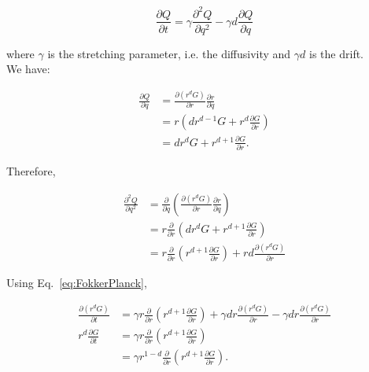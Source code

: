 \begin{equation}
\frac{\partial Q}{\partial t}=\gamma\frac{\partial^{2}Q}{\partial q^{2}}-\gamma d\frac{\partial Q}{\partial q}\label{eq:FokkerPlanck}
\end{equation}

where $\gamma$ is the stretching parameter, i.e. the diffusivity and $\gamma d$ is the drift. \\

We have:

\begin{subequations} 
\begin{align}
\frac{\partial Q}{\partial q} & =\frac{\partial(r^{d}G)}{\partial r}\frac{\partial r}{\partial q}\label{computedGdQ1}\\
 & =r\left(dr^{d-1}G+r^{d}\frac{\partial G}{\partial r}\right)\label{computedGdQ2}\\
 & =dr^{d}G+r^{d+1}\frac{\partial G}{\partial r}.
\end{align}
 \end{subequations}

Therefore,

\begin{subequations}

\begin{align}
\frac{\partial^{2}Q}{\partial q^{2}} & =\frac{\partial}{\partial q}\left(\frac{\partial(r^{d}G)}{\partial r}\frac{\partial r}{\partial q}\right)\label{computedGdQ1-1}\\
 & =r\frac{\partial}{\partial r}\left(dr^{d}G+r^{d+1}\frac{\partial G}{\partial r}\right)\label{computedGdQ2-1}\\
 & =r\frac{\partial}{\partial r}\left(r^{d+1}\frac{\partial G}{\partial r}\right)+rd\frac{\partial(r^{d}G)}{\partial r}
\end{align}

\end{subequations}

Using Eq.~\ref{eq:FokkerPlanck},

\begin{subequations}

\begin{align}
\frac{\partial(r^{d}G)}{\partial t} & =\gamma r\frac{\partial}{\partial r}\left(r^{d+1}\frac{\partial G}{\partial r}\right)+\gamma dr\frac{\partial(r^{d}G)}{\partial r}-\gamma dr\frac{\partial(r^{d}G)}{\partial r}\label{computedGdQ1-1-1}\\
r^{d}\frac{\partial G}{\partial t} & =\gamma r\frac{\partial}{\partial r}\left(r^{d+1}\frac{\partial G}{\partial r}\right)\label{computedGdQ2-1-1}\\
 & =\gamma r^{1-d}\frac{\partial}{\partial r}\left(r^{d+1}\frac{\partial G}{\partial r}\right).
\end{align}

\end{subequations}

